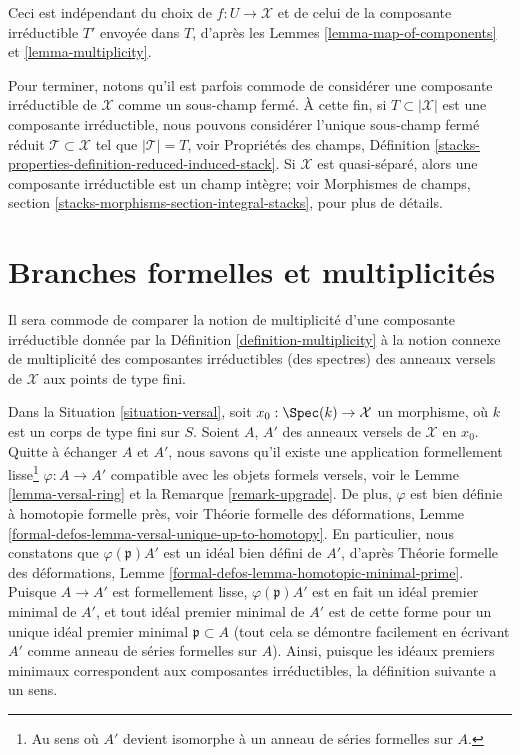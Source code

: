 \noindent
Ceci est indépendant du choix de $f : U \to \mathcal{X}$
et de celui de la composante irréductible $T'$ envoyée dans $T$,
d'après les Lemmes \ref{lemma-map-of-components} et \ref{lemma-multiplicity}.

\medskip\noindent
Pour terminer, notons qu'il est parfois commode de considérer
une composante irréductible de $\mathcal{X}$ comme un sous-champ fermé.
À cette fin, si $T \subset |\mathcal{X}|$ est une composante irréductible,
nous pouvons considérer l'unique sous-champ fermé réduit
$\mathcal{T} \subset \mathcal{X}$ tel que $|\mathcal{T}| = T$, voir
Propriétés des champs, Définition
\ref{stacks-properties-definition-reduced-induced-stack}.
Si $\mathcal{X}$ est quasi-séparé, alors
une composante irréductible est un champ intègre; voir
Morphismes de champs, section \ref{stacks-morphisms-section-integral-stacks},
pour plus de détails.



\section{Branches formelles et multiplicités}
\label{section-formal-branches}

\noindent
Il sera commode de comparer la notion de multiplicité
d'une composante irréductible donnée par la Définition \ref{definition-multiplicity}
à la notion connexe de multiplicité des composantes irréductibles
(des spectres) des anneaux versels de $\mathcal{X}$ aux points de type fini.

\medskip\noindent
Dans la Situation \ref{situation-versal}, soit $x_0 : \Spec(k) \to \mathcal{X}$
un morphisme, où $k$ est un corps de type fini sur $S$.
Soient $A$, $A'$ des anneaux versels de $\mathcal{X}$ en $x_0$.
Quitte à échanger $A$ et $A'$, nous savons qu'il existe une application
formellement lisse\footnote{Au sens où
$A'$ devient isomorphe à un anneau de séries formelles sur $A$.}
$\varphi : A \to A'$ compatible avec les objets formels versels, voir le
Lemme \ref{lemma-versal-ring} et la
Remarque \ref{remark-upgrade}.
De plus, $\varphi$ est bien définie à homotopie formelle près, voir
Théorie formelle des déformations, Lemme
\ref{formal-defos-lemma-versal-unique-up-to-homotopy}.
En particulier, nous constatons que $\varphi(\mathfrak p)A'$ est un idéal
bien défini de $A'$, d'après
Théorie formelle des déformations, Lemme
\ref{formal-defos-lemma-homotopic-minimal-prime}.
Puisque $A \to A'$ est formellement lisse,
$\varphi(\mathfrak p)A'$ est en fait un idéal premier minimal de $A'$,
et tout idéal premier minimal de $A'$ est de cette forme pour
un unique idéal premier minimal $\mathfrak p \subset A$ (tout cela
se démontre facilement en écrivant $A'$ comme anneau de séries formelles sur $A$).
Ainsi, puisque les idéaux premiers minimaux correspondent
aux composantes irréductibles, la définition suivante a un sens.

